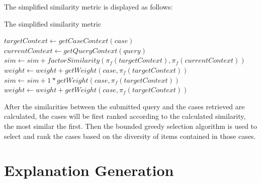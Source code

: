 The simplified similarity metric is displayed as follows:
\begin{algorithm}
\caption{The simplified similarity metric}
\label{list:similarity}
\begin{algorithmic}
	\State $targetContext \gets getCaseContext(case)$
	\State $currentContext \gets getQueryContext(query)$
			\State $sim \gets sim +  factorSimilarity(\pi_f(targetContext), \pi_f(currentContext))$
			\State $weight \gets weight + getWeight(case,\pi_f(targetContext))$
		\Else
			\State $sim \gets sim +  1*getWeight(case,\pi_f(targetContext))$
			\State $weight \gets weight + getWeight(case,\pi_f(targetContext))$
		\EndIf
	\EndFor
\EndFunction
\end{algorithmic}
\end{algorithm}

After the similarities between the submitted query and the cases retrieved are calculated, the cases will be first ranked according to the calculated similarity, the most similar the first. Then the bounded greedy selection algorithm is used to select and rank the cases based on the diversity of items contained in those cases. 

\section{Explanation Generation} \label{sec:eg}

